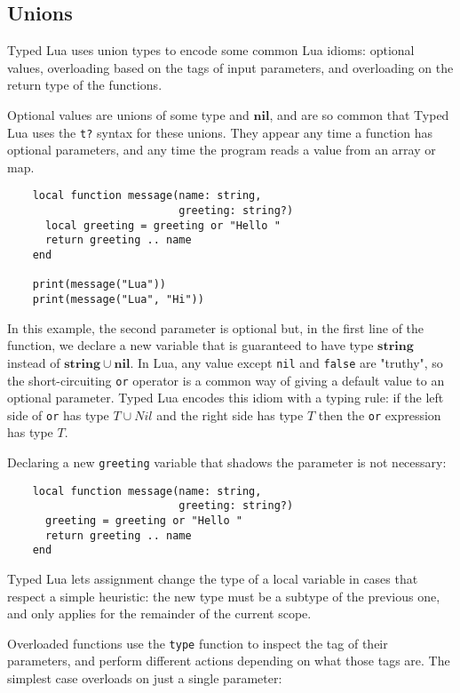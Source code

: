\documentclass[preprint]{sig-alternate}
\newcommand{\Nil}{\mathbf{nil}}
\newcommand{\String}{\mathbf{string}}
\begin{document}
\subsection{Unions}

Typed Lua uses union types to encode some common Lua idioms:
optional values, overloading based on the tags of input parameters,
and overloading on the return type of the functions.

Optional values are unions of some type and $\Nil$, and are so
common that Typed Lua uses the {\tt t?} syntax for these unions.
They appear any time a function has optional parameters, and
any time the program reads a value from an array or map.

\begin{verbatim}
    local function message(name: string,
                           greeting: string?)
      local greeting = greeting or "Hello "
      return greeting .. name
    end
    
    print(message("Lua"))
    print(message("Lua", "Hi"))
\end{verbatim}

In this example, the second parameter is optional but, in the first
line of the function, we declare a new variable that is guaranteed to
have type $\String$ instead of $\String \cup \Nil$. In Lua, any value
except {\tt nil} and {\tt false} are "truthy", so the short-circuiting
{\tt or} operator is a common way of giving a default value to an
optional parameter. Typed Lua encodes this idiom with a typing rule: if
the left side of {\tt or} has type $T \cup Nil$ and the right side
has type $T$ then the {\tt or} expression has type $T$.

Declaring a new {\tt greeting} variable that shadows the parameter
is not necessary:

\begin{verbatim}
    local function message(name: string, 
                           greeting: string?)
      greeting = greeting or "Hello "
      return greeting .. name
    end
\end{verbatim}

Typed Lua lets assignment change the type of a local variable in
cases that respect a simple heuristic: the new type must be a subtype
of the previous one, and only applies for the remainder of the
current scope.

Overloaded functions use the {\tt type} function to inspect
the tag of their parameters, and perform different actions depending
on what those tags are. The simplest case overloads on just a
single parameter:
\end{document}
